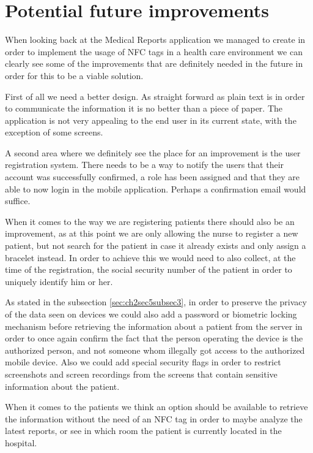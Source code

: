 \chapter{Potential future improvements}
\label{ch:6}

\par When looking back at the Medical Reports application we managed to create in order to implement the usage of NFC tags in a health care environment we can clearly see some of the improvements that are definitely needed in the future in order for this to be a viable solution.

First of all we need a better design. As straight forward as plain text is in order to communicate the information it is no better than a piece of paper. The application is not very appealing to the end user in its current state, with the exception of some screens.

A second area where we definitely see the place for an improvement is the user registration system. There needs to be a way to notify the users that their account was successfully confirmed, a role has been assigned and that they are able to now login in the mobile application. Perhaps a confirmation email would suffice.

When it comes to the way we are registering patients there should also be an improvement, as at this point we are only allowing the nurse to register a new patient, but not search for the patient in case it already exists and only assign a bracelet instead. In order to achieve this we would need to also collect, at the time of the registration, the social security number of the patient in order to uniquely identify him or her.

As stated in the subsection \ref{sec:ch2sec5subsec3}, in order to preserve the privacy of the data seen on devices we could also add a password or biometric locking mechanism before retrieving the information about a patient from the server in order to once again confirm the fact that the person operating the device is the authorized person, and not someone whom illegally got access to the authorized mobile device. Also we could add special security flags in order to restrict screenshots and screen recordings from the screens that contain sensitive information about the patient.

When it comes to the patients we think an option should be available to retrieve the information without the need of an NFC tag in order to maybe analyze the latest reports, or see in which room the patient is currently located in the hospital.


